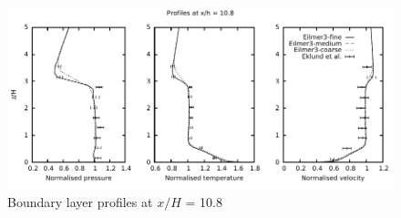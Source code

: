 %
\begin{figure}[h]
 \begin{center}
  \includegraphics[width=13.8cm]{./chap4-backward-facing-step/figs/xh_108.pdf}
 \end{center}
 \caption{Boundary layer profiles at $x/H$ = 10.8}
 \label{backward-facing-step-xH-108}
\end{figure}
%



